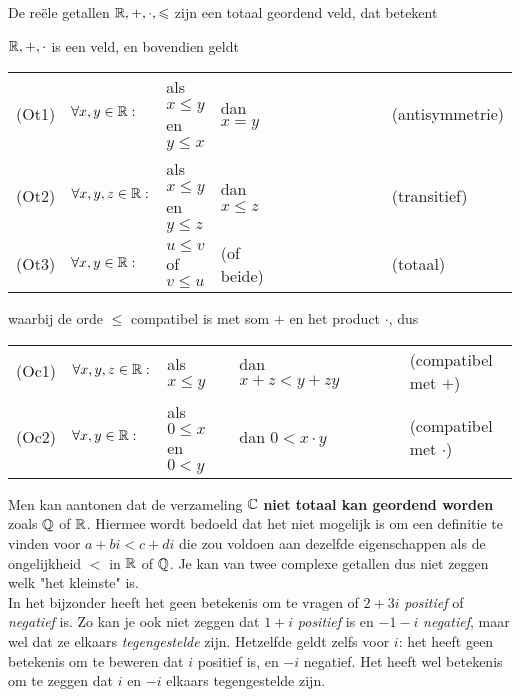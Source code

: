\documentclass{ximera}
\begin{document}
    \begin{proposition} De reële getallen $\mathbb{R},+,\cdot,\leqslant$ zijn een totaal geordend veld, dat betekent

        $\mathbb{R},+,\cdot$ is een veld, en bovendien geldt

        \begin{tabular}{llllll}
            (Ot1) & $\forall x,y \in\mathbb{R}:$ & als $ x \leq y $ en  $y \leq x$ & dan $ x=y$       & $\qquad\qquad\qquad$& (antisymmetrie) \\
            (Ot2) & $\forall x,y,z \in\mathbb{R}:$ & als $ x \leq y $ en  $y \leq z$ & dan $x\leq z$  & $\qquad\qquad\qquad$& (transitief) \\
            (Ot3) & $\forall x,y \in\mathbb{R}:$ & $ u \leq v $ of  $v \leq u $ & (of beide)          & $\qquad\qquad\qquad$& (totaal) 
        \end{tabular}

        waarbij de orde $\leq$ compatibel is met som $+$ en het product $\cdot$, dus
        
        \begin{tabular}{llllll}
            (Oc1) & $\forall x,y,z \in\mathbb{R}:$ & als $ x \leq y$ & dan $x+z < y+z y$           & $\qquad$& (compatibel met $+$) \\
            (Oc2) & $\forall x,y \in\mathbb{R}:$ & als $ 0 \leq x$ en $0< y $& dan $0 < x\cdot y$  & $\qquad$& (compatibel met $\cdot$) 
        \end{tabular}

    \end{proposition}
         

 \begin{remark} \nl

    Men kan aantonen dat de verzameling $\mathbb{C}$ \textbf{niet totaal kan geordend worden} zoals $\mathbb{Q}$ of $\mathbb{R}$. Hiermee wordt bedoeld dat het niet mogelijk is om een definitie te vinden voor $a+bi <c+di$ die zou voldoen aan dezelfde eigenschappen als de ongelijkheid $<$ in $\mathbb{R}$ of $\mathbb{Q}$. Je kan van twee complexe getallen dus niet zeggen welk "{}het kleinste{}" is.
    \\ 
    In het bijzonder heeft het geen betekenis om te vragen of $2+3i$ \textit{positief} of \textit{negatief} is. 
    Zo kan je ook niet zeggen dat $1+i$ \textit{positief} is en $-1-i$ \textit{ negatief}, maar wel dat ze elkaars \textit{tegengestelde} zijn. Hetzelfde geldt zelfs voor $i$: het heeft geen betekenis om te beweren dat $i$ positief is, en $-i$ negatief. Het heeft wel betekenis om te zeggen dat $i$ en $-i$ elkaars tegengestelde zijn.

\end{remark}
\end{document}
